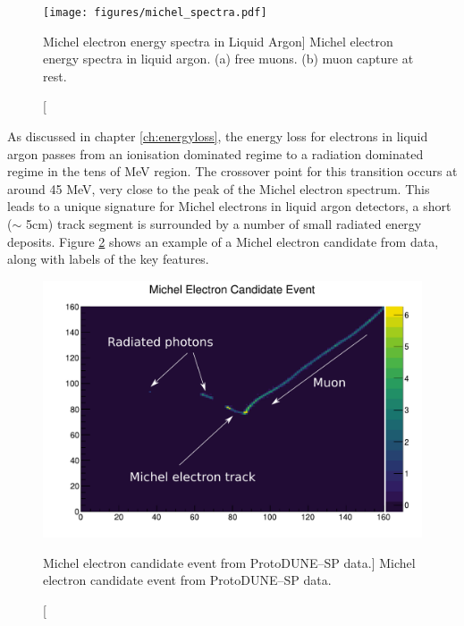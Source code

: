 \begin{figure}
	\centering
	\texttt{[image: figures/michel\_spectra.pdf]}
	\caption
	[Michel electron energy spectra in Liquid Argon]
	{Michel electron energy spectra in liquid argon. (a) free muons. (b) muon 
	capture at rest.}
	\label{fig:michel_spec}
\end{figure}


As discussed in chapter \ref{ch:energyloss}, the energy loss for electrons in
liquid argon passes from an ionisation dominated regime to a radiation dominated
regime in the tens of MeV region. The crossover point for this transition occurs
at around 45 MeV, very close to the peak of the Michel electron spectrum. This
leads to a unique signature for Michel electrons in liquid argon detectors, a
short ($\sim$ 5cm) track segment is surrounded by a number of small radiated 
energy deposits. Figure \ref{fig:michel_event} shows an example of a Michel 
electron candidate from \protodune{} data, along with labels of the key 
features.

\begin{figure}
	\centering
	\includegraphics[width=\textwidth]{figures/michel_candidate_labelled.pdf}
	\caption
	[Michel electron candidate event from ProtoDUNE--SP data.]
	{Michel electron candidate event from ProtoDUNE--SP data.}
	\label{fig:michel_event}
\end{figure}

